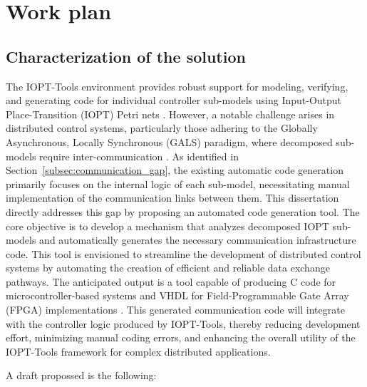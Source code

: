 
%

\chapter{Work plan}
\label{cha:work_plan}


\section{Characterization of the solution}
\label{sec:characterization_of_the_solution}

 The IOPT-Tools environment provides robust support for modeling, verifying, and generating code for individual controller sub-models using Input-Output Place-Transition (IOPT) Petri nets \cite{iopttools, barros2004, RefiningIOPT}. However, a notable challenge arises in distributed control systems, particularly those adhering to the Globally Asynchronous, Locally Synchronous (GALS) paradigm, where decomposed sub-models require inter-communication \cite{galsactd, Barrosadd}. As identified in Section~\ref{subsec:communication_gap}, the existing automatic code generation primarily focuses on the internal logic of each sub-model, necessitating manual implementation of the communication links between them. This dissertation directly addresses this gap by proposing an automated code generation tool. The core objective is to develop a mechanism that analyzes decomposed IOPT sub-models and automatically generates the necessary communication infrastructure code. This tool is envisioned to streamline the development of distributed control systems by automating the creation of efficient and reliable data exchange pathways. The anticipated output is a tool capable of producing C code for microcontroller-based systems and VHDL for Field-Programmable Gate Array (FPGA) implementations \cite{barros2004, vhld}. This generated communication code will integrate with the controller logic produced by IOPT-Tools, thereby reducing development effort, minimizing manual coding errors, and enhancing the overall utility of the IOPT-Tools framework for complex distributed applications.

A draft propossed is the following:

